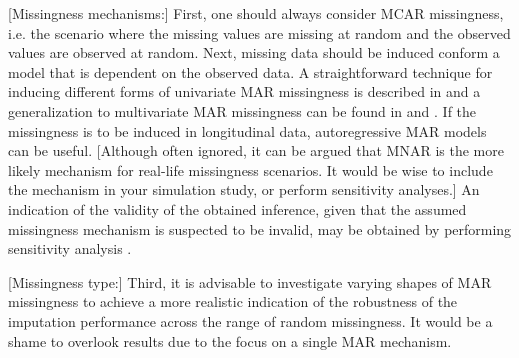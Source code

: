 \documentclass[bimj,fleqn]{w-art}
\begin{document}
[Missingness mechanisms:] 
First, one should always consider MCAR missingness, i.e. the scenario where the missing values are missing at random and the observed values are observed at random. %
Next, missing data should be induced conform a model that is dependent on the observed data. A straightforward technique for inducing different forms of univariate MAR missingness is described in \citet[][p. 63]{fimd} and a generalization to multivariate MAR missingness can be found in \citet[][Appendix B]{buur06} and \citet[][\S 5.2.3]{brand1999development}. If the missingness is to be induced in longitudinal data, autoregressive MAR models \citep[e.g. cf.][model 2 and model 3]{shara2015randomly} can be useful.
[Although often ignored, it can be argued that MNAR is the more likely mechanism for real-life missingness scenarios. It would be wise to include the mechanism in your simulation study, or perform sensitivity analyses.] An indication of the validity of the obtained inference, given that the assumed missingness mechanism is suspected to be invalid, may be obtained by performing sensitivity analysis \citep[see e.g.][part 5]{molenberghs2014handbook}.

[Missingness type:] 
Third, it is advisable to investigate varying shapes of MAR missingness to achieve a more realistic indication of the robustness of the imputation performance across the range of random missingness. %
It would be a shame to overlook results due to the focus on a single MAR mechanism. 
\end{document}
